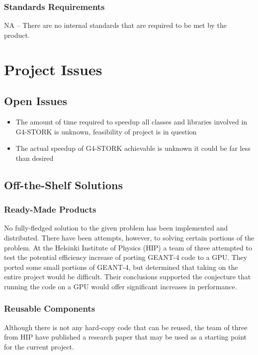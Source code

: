 \documentclass[12pt]{article}
\begin{document}
\subsubsection{Standards Requirements}
NA -- There are no internal standards that are required to be met by the product.

\section{Project Issues}

\subsection{Open Issues} %
\begin{itemize}
\item The amount of time required to speedup all classes and libraries involved in G4-STORK is unknown, feasibility of project is in question
\item The actual speedup of G4-STORK achievable is unknown it could be far less than desired
\end{itemize}

\subsection{Off-the-Shelf Solutions} %

\subsubsection{Ready-Made Products}
No fully-fledged solution to the given problem has been implemented and distributed. There have been attempts, however, to solving certain portions of the problem. At the Helsinki Institute of Physics (HIP) a team of three attempted to test the potential efficiency increase of porting GEANT-4 code to a GPU. They ported some small portions of GEANT-4, but determined that taking on the entire project would be difficult. Their conclusions supported the conjecture that running the code on a GPU would offer significant increases in performance.

\subsubsection{Reusable Components}
Although there is not any hard-copy code that can be reused, the team of three from HIP have published a research paper that may be used as a starting point for the current project.
\end{document}
